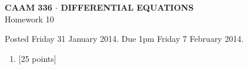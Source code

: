 \documentclass[10pt]{article}
\begin{document}
\vspace*{-5em}
\begin{center}
\large \textsf{\textbf{CAAM 336 $\cdot$ DIFFERENTIAL EQUATIONS}\\[0.5em]
Homework 10 }
\end{center}

Posted Friday 31 January 2014.  Due 1pm Friday 7 February 2014.

\begin{enumerate}\addtocounter{enumi}{9}
\item {[25 points]}\\  

\end{enumerate}
\end{document}
